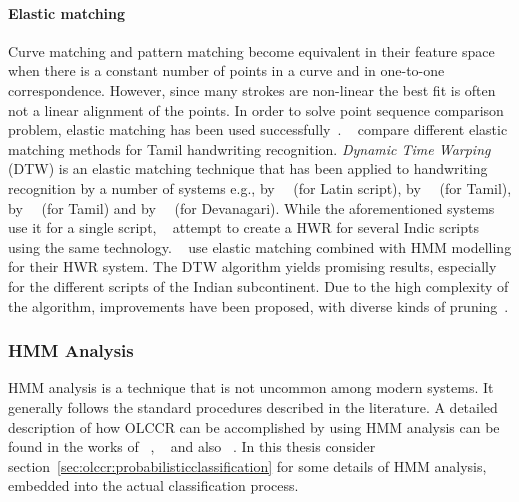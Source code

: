 \paragraph{Elastic matching}
Curve matching and pattern matching become equivalent in their feature space
when there is a constant number of points in a curve and in one-to-one 
correspondence. However, since many strokes are non-linear the best fit is often
not a linear alignment of the points.
In order to solve point sequence comparison problem, elastic matching has 
been used successfully~.
~\citeyear{Joshi2004a} compare different elastic matching methods for Tamil 
handwriting recognition. \emph{Dynamic Time Warping} (DTW) is an elastic 
matching technique that has been applied to handwriting recognition by a number 
of systems e.g., by~~\citeyear{Vuori2001} (for Latin script), 
by~~\citeyear{Niels2004} (for Tamil), 
by~~\citeyear{Joshi2004b} (for Tamil) and 
by~~\citeyear{Joshi2005} (for Devanagari). 
While the aforementioned systems use it for a single script, 
~\citeyear{Bharath2009} attempt to create a HWR for several 
Indic scripts using the same technology. 
~\citeyear{BahlmannBurkhardt2004} use elastic 
matching combined with HMM modelling for their HWR system. 
The DTW algorithm yields promising results, 
especially for the different scripts of the Indian subcontinent.
Due to the high complexity of the algorithm, improvements have been proposed,
with diverse kinds of pruning~.

\subsubsection{HMM Analysis}
\label{sec:hmmanalysis}

HMM analysis is a technique that is not uncommon among modern systems.
It generally follows the standard procedures described in the literature.
A detailed description of how OLCCR can be
accomplished by using HMM analysis can be found in the works of 
~\citeyear{Hu1996},
~\citeyear{Hu2000} and also 
~\citeyear{BahlmannBurkhardt2004}.
In this thesis consider section~\ref{sec:olccr:probabilisticclassification} for
some details of HMM analysis, embedded into the actual classification process.

